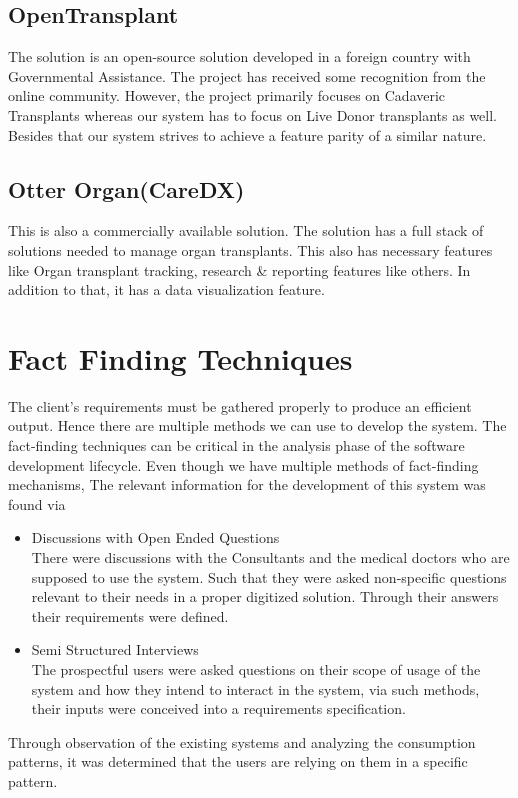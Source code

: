 \documentclass[12pt,a4paper]{report}
\begin{document}
\subsection{OpenTransplant}
The solution is an open-source solution developed in a foreign country with Governmental Assistance. The project has received some recognition from the online community. However, the project primarily focuses on Cadaveric Transplants whereas our system has to focus on Live Donor transplants as well. Besides that our system strives to achieve a feature parity of a similar nature.\cite{opentransplant}

\subsection{Otter Organ(CareDX)}

This is also a commercially available solution. The solution has a full stack of solutions needed to manage organ transplants. This also has necessary features like Organ transplant tracking, research \& reporting features like others. In addition to that, it has a data visualization feature. \cite{otter}



\section{Fact Finding Techniques}

The client’s requirements must be gathered properly to produce an efficient output. Hence there are multiple methods we can use to develop the system. The fact-finding techniques can be critical in the analysis phase of the software development lifecycle. Even though we have multiple methods of fact-finding mechanisms, The relevant information for the development of this system was found via 
\begin{itemize}
	\item Discussions with Open Ended Questions \\
	There were discussions with the Consultants and the medical doctors who are supposed to use the system. Such that they were asked non-specific questions relevant to their needs in a proper digitized solution. Through their answers their requirements were defined.
	\item Semi Structured Interviews \\
	The prospectful users were asked questions on their scope of usage of the system and how they intend to interact in the system, via such methods, their inputs were conceived into a requirements specification. 
\end{itemize}
Through observation of the existing systems and analyzing the consumption patterns, it was determined that the users are relying on them in a specific pattern.  
\end{document}
